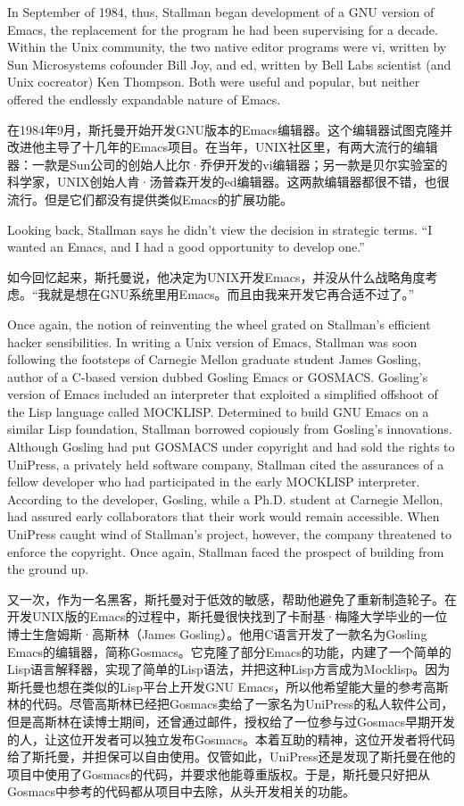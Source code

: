 \ifdefined\eng
In September of 1984, thus, Stallman began development of a GNU version of Emacs, the replacement for the program he had been supervising for a decade. Within the Unix community, the two native editor programs were vi, written by Sun Microsystems cofounder Bill Joy, and ed, written by Bell Labs scientist (and Unix cocreator) Ken Thompson. Both were useful and popular, but neither offered the endlessly expandable nature of Emacs.
\fi

\ifdefined\chs
在1984年9月，斯托曼开始开发GNU版本的Emacs编辑器。这个编辑器试图克隆并改进他主导了十几年的Emacs项目。在当年，UNIX社区里，有两大流行的编辑器：一款是Sun公司的创始人比尔·乔伊开发的vi编辑器；另一款是贝尔实验室的科学家，UNIX创始人肯·汤普森开发的ed编辑器。这两款编辑器都很不错，也很流行。但是它们都没有提供类似Emacs的扩展功能。
\fi

\ifdefined\eng
Looking back, Stallman says he didn't view the decision in strategic terms. ``I wanted an Emacs, and I had a good opportunity to develop one.''
\fi

\ifdefined\chs
如今回忆起来，斯托曼说，他决定为UNIX开发Emacs，并没从什么战略角度考虑。``我就是想在GNU系统里用Emacs。而且由我来开发它再合适不过了。''
\fi

\ifdefined\vone
\ifdefined\eng
Once again, the notion of reinventing the wheel grated on Stallman's efficient hacker sensibilities. In writing a Unix version of Emacs, Stallman was soon following the footsteps of Carnegie Mellon graduate student James Gosling, author of a C-based version dubbed Gosling Emacs or GOSMACS. Gosling's version of Emacs included an interpreter that exploited a simplified offshoot of the Lisp language called MOCKLISP. Determined to build GNU Emacs on a similar Lisp foundation, Stallman borrowed copiously from Gosling's innovations. Although Gosling had put GOSMACS under copyright and had sold the rights to UniPress, a privately held software company, Stallman cited the assurances of a fellow developer who had participated in the early MOCKLISP interpreter. According to the developer, Gosling, while a Ph.D. student at Carnegie Mellon, had assured early collaborators that their work would remain accessible. When UniPress caught wind of Stallman's project, however, the company threatened to enforce the copyright. Once again, Stallman faced the prospect of building from the ground up.
\fi

\ifdefined\chs
又一次，作为一名黑客，斯托曼对于低效的敏感，帮助他避免了重新制造轮子。在开发UNIX版的Emacs的过程中，斯托曼很快找到了卡耐基·梅隆大学毕业的一位博士生詹姆斯·高斯林（James Gosling）。他用C语言开发了一款名为Gosling Emacs的编辑器，简称Gosmacs。它克隆了部分Emacs的功能，内建了一个简单的Lisp语言解释器，实现了简单的Lisp语法，并把这种Lisp方言成为Mocklisp。因为斯托曼也想在类似的Lisp平台上开发GNU Emacs，所以他希望能大量的参考高斯林的代码。尽管高斯林已经把Gosmacs卖给了一家名为UniPress的私人软件公司，但是高斯林在读博士期间，还曾通过邮件，授权给了一位参与过Gosmacs早期开发的人，让这位开发者可以独立发布Gosmacs。本着互助的精神，这位开发者将代码给了斯托曼，并担保可以自由使用。仅管如此，UniPress还是发现了斯托曼在他的项目中使用了Gosmacs的代码，并要求他能尊重版权。于是，斯托曼只好把从Gosmacs中参考的代码都从项目中去除，从头开发相关的功能。

